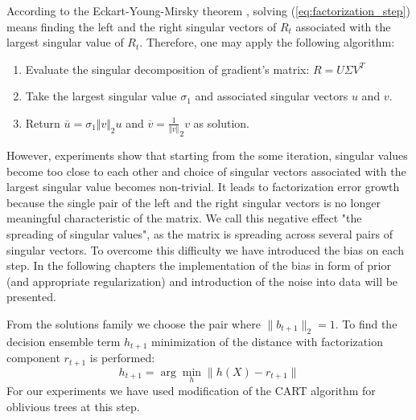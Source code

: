\documentclass{article}
\begin{document}
According to the Eckart-Young-Mirsky theorem \cite{Eckart1936}, solving (\ref{eq:factorization_step}) means finding the left and the right singular vectors of $R_t$ associated with the largest singular value of $R_t$. Therefore, one may apply the following algorithm: 
\begin{enumerate}
	\item Evaluate the singular decomposition of gradient's matrix: $R = U \Sigma V^T$
	\item Take the largest singular value $\sigma_{1}$ and associated singular vectors $u$ and $v$.
	\item Return $\overline{u}={\sigma_{1}}{\Vert v \Vert}_{2}u$ and $\overline{v}=\frac{1}{\Vert v \Vert}_{2}v$ as solution.
\end{enumerate}
However, experiments show that starting from the some iteration, singular values become too close to each other and choice of singular vectors associated with the largest singular value becomes non-trivial. It leads to factorization error growth because the single pair of the left and the right singular vectors is no longer meaningful characteristic of the matrix. We call this negative effect "the spreading of singular values", as the matrix is spreading across several pairs of singular vectors. To overcome this difficulty we have introduced the bias on each step. In the following chapters the implementation of the bias in form of prior (and appropriate regularization) and introduction of the noise into data will be presented.

From the solutions family we choose the pair where $\|b_{t+1}\|_2 = 1$. To find the decision ensemble term $h_{t+1}$ minimization of the distance with factorization component $r_{t+1}$ is performed:
\begin{equation}
h_{t+1}	= \arg \min_{h} \|h(X) - r_{t+1}\|
\label{eq:minimization_step}
\end{equation}
For our experiments we have used modification of the CART algorithm for oblivious trees \cite{Gulin_winningthe} at this step.

\end{document}
